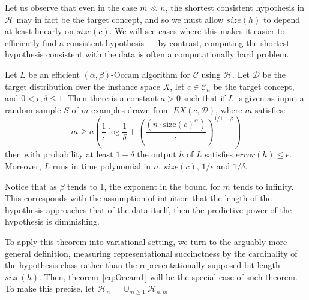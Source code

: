 Let us observe that even in the case $m\ll n$, the shortest consistent hypothesis in $\mathcal{H}$ may in fact be the target concept, and so we must allow $size(h)$ to depend at least linearly on $size(c)$. We will see cases where this makes it easier to efficiently find a consistent hypothesis --- by contrast, computing the shortest hypothesis consistent with the data is often a computationally hard problem. 

\begin{theorem}\label{eq:Occam1}
    Let $L$ be an efficient $(\alpha,\beta)$-Occam algorithm for $\mathcal{C}$ using $\mathcal{H}$. Let $\mathcal{D}$ be the target distribution over the instance space $X$, let $c\in \mathcal{C}_{n}$ be the target concept, and $0< \epsilon, \delta \leq 1$. Then there is a constant $a>0$ such that if $L$ is given as input a random sample $S$ of $m$ examples drawn from $EX(c,\mathcal{D})$, where $m$ satisfies: 
    \begin{equation}
        m \geq a \left( \frac{1}{\epsilon} \log{\frac{1}{\delta}} + \left(\frac{(n\cdot \mathrm{size}(c)^{\alpha})}{\epsilon}\right)^{1/1-\beta} \right)
    \end{equation}
    then with probability at least $1-\delta$ the output $h$ of $L$ satisfies $error(h)\leq \epsilon$. Moreover, $L$ runs in time polynomial in $n$, $size(c)$, $1/\epsilon$ and $1/\delta$.  
\end{theorem}
Notice that as $\beta$ tends to 1, the exponent in the bound for $m$ tends to infinity. This corresponds with the assumption of intuition that the length of the hypothesis approaches that of the data itself, then the predictive power of the hypothesis is diminishing. 

To apply this theorem into variational setting, we turn to the arguably more general definition, measuring representational succinctness by the cardinality of the hypothesis class rather than the representationally supposed bit length $size(h)$. Then, theorem~\ref{eq:Occam1} will be the special case of such theorem. To make this precise, let $\mathcal{H}_{n}= \cup_{m\geq 1}\mathcal{H}_{n,m}$ 


